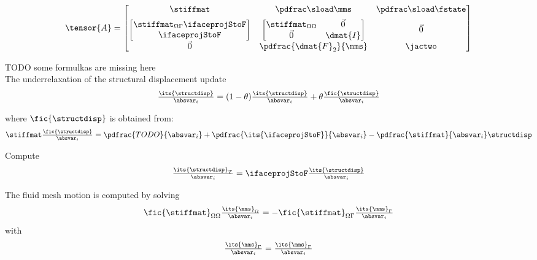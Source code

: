 \documentclass[../main.tex]{subfiles}
\begin{document}
\def\AtwooneALE{\begin{bmatrix}
                \stiffmat_{\Omega \Gamma} \ifaceprojStoF \\
                \ifaceprojStoF
                \end{bmatrix}
               }
\def\AtwotwoALE{
               \begin{bmatrix}
               \stiffmat_{\Omega \Omega} & \vec{0}  \\
               \vec{0}                   & \dmat{I}
               \end{bmatrix}
               }
\def\AtwothreeALE{\vec{0}}

\def\AthreeoneALE{\vec{0}}
\def\AthreetwoALE{\pdfrac{\dmat{F}_2}{\mms}}
\def\AthreethreeALE{\jactwo}                       %
\begin{align}\label{eq:Amatrix_ALE}
\tensor{A}=
\begin{bmatrix}
\AoneoneALE    &  \AonetwoALE    &  \AonethreeALE  \\[0.5em]
\AtwooneALE    &  \AtwotwoALE    &  \AtwothreeALE  \\[0.5em]
\AthreeoneALE  &  \AthreetwoALE  &  \AthreethreeALE
\end{bmatrix}
\end{align}



TODO some formulkas are missing here
\\
The underrelaxation of the structural displacement update
\begin{align}\label{eq:underrelax_structdisp}
\tfrac{\its{\structdisp}}{\absvar_i} =
(1-\theta)
\tfrac{\its{\structdisp}}{\absvar_i} +
\theta \tfrac{\fic{\structdisp}}{\absvar_i}
\end{align}

where $\fic{\structdisp}$ is obtained from:
\begin{align}\label{eq:fictious_structdisp}
\stiffmat \tfrac{\fic{\structdisp}}{\absvar_i} =
\pdfrac{TODO}{\absvar_i} + \pdfrac{\its{\ifaceprojStoF}}{\absvar_i} -
\pdfrac{\stiffmat}{\absvar_i} \structdisp
\end{align}


Compute
\begin{equation}\label{eq:TODO}
\tfrac{\its{\structdisp}_T}{\absvar_i} =
\ifaceprojStoF \tfrac{\its{\structdisp}}{\absvar_i}
\end{equation}

The fluid mesh motion is computed by solving
\begin{align}\label{eq:mms_domain}
\fic{\stiffmat}_{\Omega \Omega}  \tfrac{\its{\mms}_{\Omega}}{\absvar_i} =
-\fic{\stiffmat}_{\Omega \Gamma} \tfrac{\its{\mms}_{\Gamma}}{\absvar_i}
\end{align}
with
\begin{align}
\tfrac{\its{\mms}_{\Gamma}}{\absvar_i} =
\tfrac{\its{\mms}_{\Gamma}}{\absvar_i}
\end{align}
\end{document}
